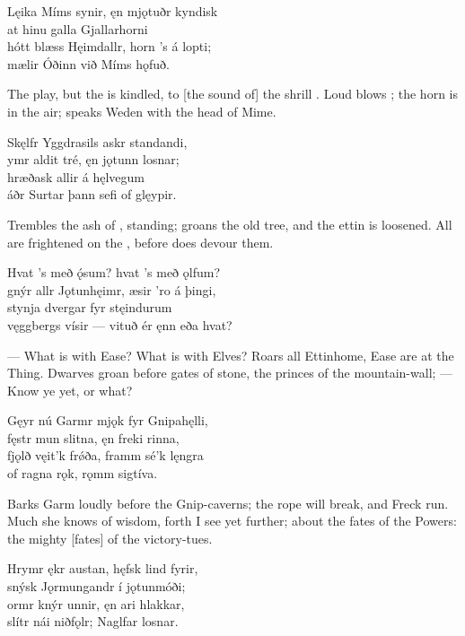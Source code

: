 \bva Lęika Míms synir, \hld ęn mjǫtuðr kyndisk \\%
at hinu galla \hld Gjallarhorni \\%
hótt blæss Hęimdallr, \hld horn ’s á lopti; \\%
mælir Óðinn \hld við Míms hǫfuð.\eva

\bvb The  play, but the  is kindled, to [the sound of] the shrill . Loud blows ; the horn is in the air; speaks Weden with the head of Mime.\evb

\bva Skęlfr Yggdrasils \hld askr standandi, \\%
ymr aldit tré, \hld ęn jǫtunn losnar; \\%
hræðask allir \hld á hęlvegum \\%
áðr Surtar þann \hld sefi of glęypir.\eva

\bvb Trembles the ash of , standing; groans the old tree, and the ettin is loosened. All are frightened on the , before  does devour them.\evb

\bva Hvat ’s með ǫ́sum? \hld hvat ’s með ǫlfum? \\%
gnýr allr Jǫtunhęimr, \hld æsir ’ro á þingi, \\%
stynja dvergar \hld fyr stęindurum \\%
vęggbergs vísir — \hld vituð ér ęnn eða hvat?\eva

\bvb — What is with Ease? What is with Elves? Roars all Ettinhome, Ease are at the Thing. Dwarves groan before gates of stone, the princes of the mountain-wall; — Know ye yet, or what?\evb

\bva Gęyr nú Garmr mjǫk \hld fyr Gnipahęlli, \\%
fęstr mun slitna, \hld ęn freki rinna, \\%
fjǫlð vęit’k frǿða, \hld framm sé’k lęngra \\%
of ragna rǫk, \hld rǫmm sigtíva.\eva

\bvb Barks Garm loudly before the Gnip-caverns; the rope will break, and Freck run. Much she knows of wisdom, forth I see yet further; about the fates of the Powers: the mighty [fates] of the victory-tues.\evb

\bva Hrymr ękr austan, \hld hęfsk lind fyrir, \\%
snýsk Jǫrmungandr \hld í jǫtunmóði; \\%
ormr knýr unnir, \hld ęn ari hlakkar, \\%
slítr nái niðfǫlr; \hld Naglfar losnar.\eva

